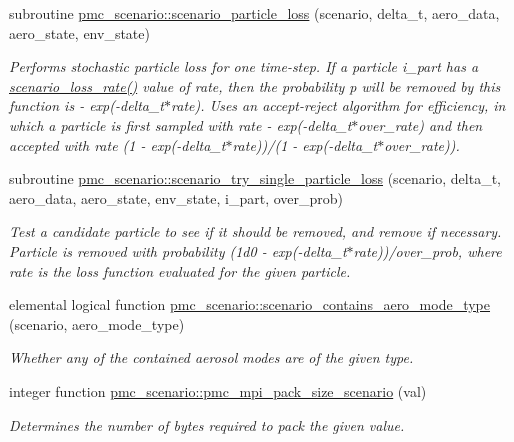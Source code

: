 \begin{DoxyCompactItemize}
subroutine \mbox{\hyperlink{namespacepmc__scenario_a275a4562c174d7090db3120235d4e97f}{pmc\+\_\+scenario\+::scenario\+\_\+particle\+\_\+loss}} (scenario, delta\+\_\+t, aero\+\_\+data, aero\+\_\+state, env\+\_\+state)
\begin{DoxyCompactList}\small\item\em Performs stochastic particle loss for one time-\/step. If a particle {\ttfamily i\+\_\+part} has a \mbox{\hyperlink{namespacepmc__scenario_ab60e2eeb66ae8849ad11923d76a9bd7f}{scenario\+\_\+loss\+\_\+rate()}} value of rate, then the probability p will be removed by this function is { -\/ exp(-\/delta\+\_\+t$\ast$rate)}. Uses an accept-\/reject algorithm for efficiency, in which a particle is first sampled with rate { -\/ exp(-\/delta\+\_\+t$\ast$over\+\_\+rate) } and then accepted with rate {\ttfamily (1 -\/ exp(-\/delta\+\_\+t$\ast$rate))/(1 -\/ exp(-\/delta\+\_\+t$\ast$over\+\_\+rate))}. \end{DoxyCompactList}\item 
subroutine \mbox{\hyperlink{namespacepmc__scenario_ab3b05e77d36cc1b27c10ebd8d315df61}{pmc\+\_\+scenario\+::scenario\+\_\+try\+\_\+single\+\_\+particle\+\_\+loss}} (scenario, delta\+\_\+t, aero\+\_\+data, aero\+\_\+state, env\+\_\+state, i\+\_\+part, over\+\_\+prob)
\begin{DoxyCompactList}\small\item\em Test a candidate particle to see if it should be removed, and remove if necessary. Particle is removed with probability (1d0 -\/ exp(-\/delta\+\_\+t$\ast$rate))/over\+\_\+prob, where rate is the loss function evaluated for the given particle. \end{DoxyCompactList}\item 
elemental logical function \mbox{\hyperlink{namespacepmc__scenario_afaea66be4e0e1ec9a4b80a2fda61f972}{pmc\+\_\+scenario\+::scenario\+\_\+contains\+\_\+aero\+\_\+mode\+\_\+type}} (scenario, aero\+\_\+mode\+\_\+type)
\begin{DoxyCompactList}\small\item\em Whether any of the contained aerosol modes are of the given type. \end{DoxyCompactList}\item 
integer function \mbox{\hyperlink{namespacepmc__scenario_a135753482d6e0a63cf3947e6e017c618}{pmc\+\_\+scenario\+::pmc\+\_\+mpi\+\_\+pack\+\_\+size\+\_\+scenario}} (val)
\begin{DoxyCompactList}\small\item\em Determines the number of bytes required to pack the given value. \end{DoxyCompactList}\item 

\end{DoxyCompactItemize}
